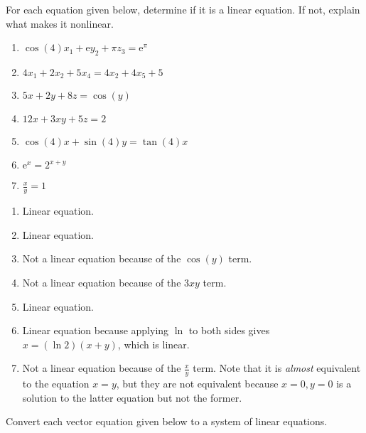 \begin{exercises}
	\begin{problist}
		\prob For each equation given below, determine if it is a linear
		equation. If not, explain what makes it nonlinear.
		\begin{enumerate}
			\item $\cos(4)x_{1}+\mathrm{e}y_{2}+\pi z_{3}=\mathrm{e}^{\pi}$

			\item $4x_{1}+2x_{2}+5x_{4}=4x_{2}+4x_{5}+5$

			\item $5x+2y+8z=\cos(y)$

			\item $12x+3xy+5z=2$

			\item $\cos(4)x+\sin(4)y=\tan(4)x$

			\item $\mathrm{e}^{x}=2^{x+y}$

			\item $\frac{x}{y}=1$
		\end{enumerate}
		\begin{solution}
			\begin{enumerate}
				\item Linear equation.

				\item Linear equation.

				\item Not a linear equation because of the $\cos(y)$ term.

				\item Not a linear equation because of the $3xy$ term.

				\item Linear equation.

				\item Linear equation because applying $\ln$ to both sides gives
					$x=(\ln 2)(x+y)$, which is linear.

				\item Not a linear equation because of the $\frac{x}{y}$ term.
					Note that it is \emph{almost} equivalent to the equation $x=y$,
					but they are not equivalent because $x = 0,y = 0$ is a
					solution to the latter equation but not the former.
			\end{enumerate}
		\end{solution}

		\prob Convert each vector equation given below to a system of linear
		equations.


\end{problist}
\end{exercises}
